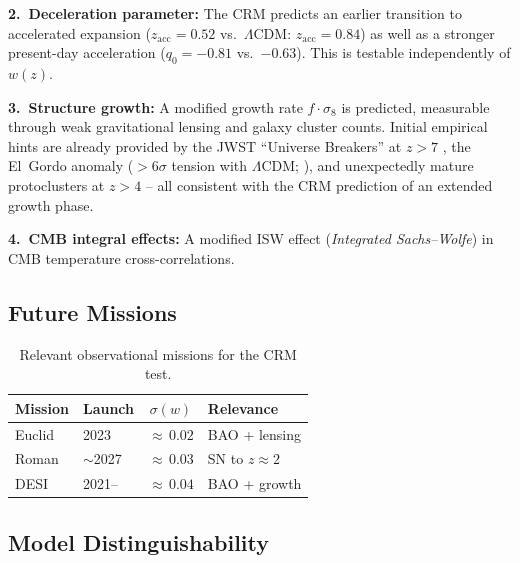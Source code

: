 \documentclass[aps,prd,twocolumn,superscriptaddress,nofootinbib]{revtex4-2}
\begin{document}
\textbf{2.~Deceleration parameter:} The CRM predicts an earlier transition to accelerated expansion ($z_{\mathrm{acc}} = 0.52$ vs.\ $\Lambda$CDM: $z_{\mathrm{acc}} = 0.84$) as well as a stronger present-day acceleration ($q_0 = -0.81$ vs.\ $-0.63$). This is testable independently of $w(z)$.

\textbf{3.~Structure growth:} A modified growth rate $f \cdot \sigma_8$ is predicted, measurable through weak gravitational lensing and galaxy cluster counts. Initial empirical hints are already provided by the JWST ``Universe Breakers'' at $z > 7$ \cite{Labbe2023}, the El~Gordo anomaly ($> 6\sigma$ tension with $\Lambda$CDM; \cite{Asencio2023}), and unexpectedly mature protoclusters at $z > 4$ \cite{Miller2018} -- all consistent with the CRM prediction of an extended growth phase.

\textbf{4.~CMB integral effects:} A modified ISW effect (\textit{Integrated Sachs--Wolfe}) in CMB temperature cross-correlations.

\subsection{Future Missions}

\begin{table}[htbp]
\centering
\caption{Relevant observational missions for the CRM test.}
\label{tab:missions}
\small
\begin{tabular}{llcl}
\toprule
\textbf{Mission} & \textbf{Launch} & $\sigma(w)$ & \textbf{Relevance} \\
\midrule
Euclid & 2023 & ${\approx}\,0.02$ & BAO + lensing \\
Roman & ${\sim}$2027 & ${\approx}\,0.03$ & SN to $z \approx 2$ \\
DESI & 2021-- & ${\approx}\,0.04$ & BAO + growth \\
\bottomrule
\end{tabular}
\end{table}


\subsection{Model Distinguishability}
\end{document}
